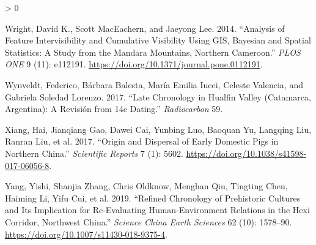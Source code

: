 \documentclass[
]{article}
\newlength{\cslhangindent}
\newenvironment{CSLReferences}[2] %
 {%
  \setlength{\parindent}{0pt}
  \ifodd #1 \everypar{\setlength{\hangindent}{\cslhangindent}}\ignorespaces\fi
  \ifnum #2 > 0
  \setlength{\parskip}{#2\baselineskip}
  \fi
 }%
 {}
\begin{document}
\begin{CSLReferences}{1}{0}
\leavevmode\hypertarget{ref-wright_analysis_2014}{}%
Wright, David K., Scott MacEachern, and Jaeyong Lee. 2014. {``Analysis
of {Feature} {Intervisibility} and {Cumulative} {Visibility} {Using}
{GIS}, {Bayesian} and {Spatial} {Statistics}: {A} {Study} from the
{Mandara} {Mountains}, {Northern} {Cameroon}.''} \emph{PLOS ONE} 9 (11):
e112191. \url{https://doi.org/10.1371/journal.pone.0112191}.

\leavevmode\hypertarget{ref-wynveldt_late_2017}{}%
Wynveldt, Federico, Bárbara Balesta, María Emilia Iucci, Celeste
Valencia, and Gabriela Soledad Lorenzo. 2017. {``Late Chronology in
{Hualfin} Valley ({Catamarca}, {Argentina}): A Revisión from {14c}
Dating.''} \emph{Radiocarbon} 59.

\leavevmode\hypertarget{ref-xiang_origin_2017}{}%
Xiang, Hai, Jianqiang Gao, Dawei Cai, Yunbing Luo, Baoquan Yu, Langqing
Liu, Ranran Liu, et al. 2017. {``Origin and Dispersal of Early Domestic
Pigs in Northern {China}.''} \emph{Scientific Reports} 7 (1): 5602.
\url{https://doi.org/10.1038/s41598-017-06056-8}.

\leavevmode\hypertarget{ref-yang_refined_2019}{}%
Yang, Yishi, Shanjia Zhang, Chris Oldknow, Menghan Qiu, Tingting Chen,
Haiming Li, Yifu Cui, et al. 2019. {``Refined Chronology of Prehistoric
Cultures and Its Implication for Re-Evaluating Human-Environment
Relations in the {Hexi} {Corridor}, Northwest {China}.''} \emph{Science
China Earth Sciences} 62 (10): 1578--90.
\url{https://doi.org/10.1007/s11430-018-9375-4}.

\end{CSLReferences}
\end{document}
